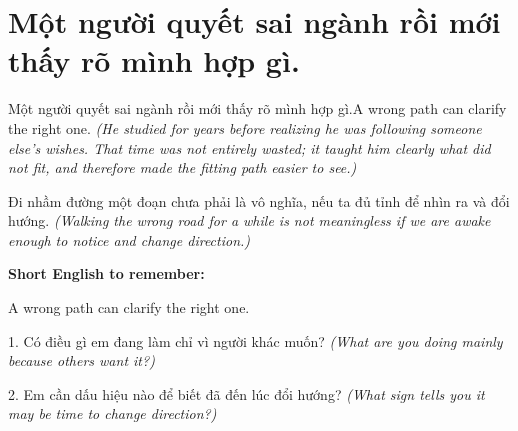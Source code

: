\section{Một người quyết sai ngành rồi mới thấy rõ mình hợp gì.}
\begin{truyen}{Một người quyết sai ngành rồi mới thấy rõ mình hợp gì.}{A wrong path can clarify the right one.}
\textit{(He studied for years before realizing he was following someone else's wishes. That time was not entirely wasted; it taught him clearly what did not fit, and therefore made the fitting path easier to see.)}
\end{truyen}
\begin{baihoc}
Đi nhầm đường một đoạn chưa phải là vô nghĩa, nếu ta đủ tỉnh để nhìn ra và đổi hướng.
\textit{(Walking the wrong road for a while is not meaningless if we are awake enough to notice and change direction.)}
\end{baihoc}
\begin{ghinhoanh}\textbf{Short English to remember:}

A wrong path can clarify the right one.
\end{ghinhoanh}
\begin{tuhocnhanh}
1. Có điều gì em đang làm chỉ vì người khác muốn? \textit{(What are you doing mainly because others want it?)}

2. Em cần dấu hiệu nào để biết đã đến lúc đổi hướng? \textit{(What sign tells you it may be time to change direction?)}
\end{tuhocnhanh}
\ngancach

